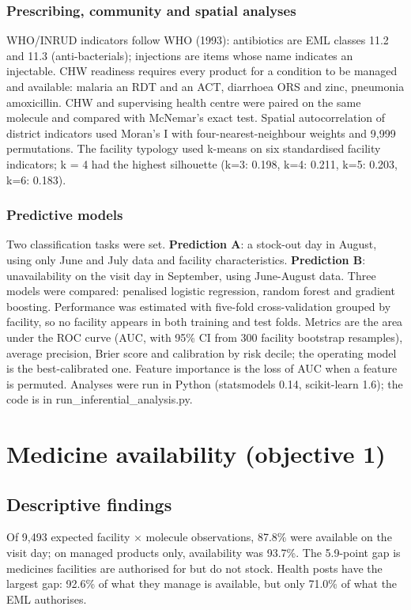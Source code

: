\documentclass[10pt,a4paper]{report}
\begin{document}
\subsection{Prescribing, community and spatial analyses}
WHO/INRUD indicators follow WHO (1993): antibiotics are EML classes 11.2 and 11.3 (anti-bacterials); injections are items whose name indicates an injectable. CHW readiness requires every product for a condition to be managed and available: malaria an RDT and an ACT, diarrhoea ORS and zinc, pneumonia amoxicillin. CHW and supervising health centre were paired on the same molecule and compared with McNemar's exact test. Spatial autocorrelation of district indicators used Moran's I with four-nearest-neighbour weights and 9,999 permutations. The facility typology used k-means on six standardised facility indicators; k = 4 had the highest silhouette (k=3: 0.198, k=4: 0.211, k=5: 0.203, k=6: 0.183).

\subsection{Predictive models}
Two classification tasks were set. \textbf{Prediction A}: a stock-out day in August, using only June and July data and facility characteristics. \textbf{Prediction B}: unavailability on the visit day in September, using June-August data. Three models were compared: penalised logistic regression, random forest and gradient boosting. Performance was estimated with five-fold cross-validation grouped by facility, so no facility appears in both training and test folds. Metrics are the area under the ROC curve (AUC, with 95\% CI from 300 facility bootstrap resamples), average precision, Brier score and calibration by risk decile; the operating model is the best-calibrated one. Feature importance is the loss of AUC when a feature is permuted. Analyses were run in Python (statsmodels 0.14, scikit-learn 1.6); the code is in run\_inferential\_analysis.py.

\chapter{Medicine availability (objective 1)}
\section{Descriptive findings}
Of 9,493 expected facility $\times$ molecule observations, 87.8\% were available on the visit day; on managed products only, availability was 93.7\%. The 5.9-point gap is medicines facilities are authorised for but do not stock. Health posts have the largest gap: 92.6\% of what they manage is available, but only 71.0\% of what the EML authorises.
\end{document}
